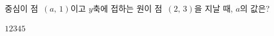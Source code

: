 중심이 점~$(a,\,1)$이고 $y$축에 접하는 원이 점~$(2,\,3)$을 지날 때, $a$의 값은?
\begin{choices32}{$1$}{$2$}{$3$}{$4$}{$5$}\end{choices32}
